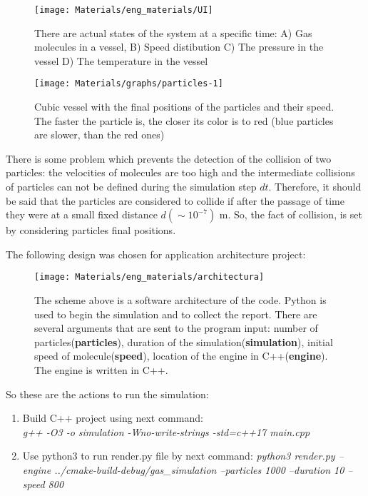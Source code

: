 \documentclass[12pt,twoside]{article}
\begin{document}
    \begin{figure}[H]
        \centering
        {\texttt{[image: Materials/eng\_materials/UI]}}
        \caption{There are actual states of the system at a specific time: A) Gas molecules in a vessel, B) Speed distibution 
        C) The pressure in the vessel D) The temperature in the vessel }
    \end{figure}
  
    \begin{figure}[H]
        \centering
        {\texttt{[image: Materials/graphs/particles-1]}}
        \caption{Cubic vessel with the final positions of the particles and their speed. 
        The faster the particle is, the closer its color is to red (blue particles are slower, than the red ones)}
    \end{figure}

    There is some problem which prevents the detection of the collision of two particles: the velocities of molecules are too high 
    and the intermediate collisions of particles can not be defined during the simulation step $dt$.
    Therefore, it should be said that the particles are considered to collide if after the passage of time they were at a small fixed distance $d(\sim 10^{-7})$ m.
    So, the fact of collision, is set by considering particles final positions.

    The following design was chosen for application architecture project:

    \begin{figure}[H]
        \centering
        {\texttt{[image: Materials/eng\_materials/architectura]}}
        \caption{The scheme above is a software architecture of the code. Python is used to begin the simulation and to collect the report.
        There are several arguments that are sent to the program input: number of particles(\textbf{particles}), duration of the simulation(\textbf{simulation}),
        initial speed of molecule(\textbf{speed}), location of the engine in C++(\textbf{engine}). The engine is written in C++.}
    \end{figure}

    So these are the actions to run the simulation:
    \begin{enumerate}
        \item Build C++ project using next command: \\ \em{g++ -O3 -o simulation -Wno-write-strings -std=c++17 main.cpp}
        \item Use python3 to run render.py file by next command: 
        \em{python3 render.py --engine ../cmake-build-debug/gas\_simulation --particles 1000 --duration 10 --speed 800}
    \end{enumerate}
\end{document}
